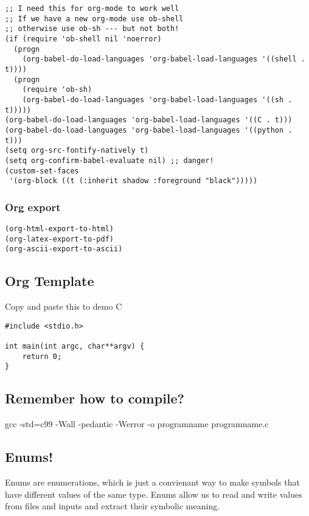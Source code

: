 \documentclass[11pt]{article}
\begin{document}
\begin{verbatim}
;; I need this for org-mode to work well
;; If we have a new org-mode use ob-shell
;; otherwise use ob-sh --- but not both!
(if (require 'ob-shell nil 'noerror)
  (progn
    (org-babel-do-load-languages 'org-babel-load-languages '((shell . t))))
  (progn
    (require 'ob-sh)
    (org-babel-do-load-languages 'org-babel-load-languages '((sh . t)))))
(org-babel-do-load-languages 'org-babel-load-languages '((C . t)))
(org-babel-do-load-languages 'org-babel-load-languages '((python . t)))
(setq org-src-fontify-natively t)
(setq org-confirm-babel-evaluate nil) ;; danger!
(custom-set-faces
 '(org-block ((t (:inherit shadow :foreground "black")))))
\end{verbatim}

\subsubsection{Org export}
\label{sec:org2a87fcf}
\begin{verbatim}
(org-html-export-to-html)
(org-latex-export-to-pdf)
(org-ascii-export-to-ascii)
\end{verbatim}

\subsection{Org Template}
\label{sec:org5a42856}
Copy and paste this to demo C

\begin{verbatim}
#include <stdio.h>

int main(int argc, char**argv) {
    return 0;
}
\end{verbatim}

\subsection{Remember how to compile?}
\label{sec:org9943a28}

gcc -std=c99 -Wall -pedantic -Werror -o programname programname.c


\subsection{Enums!}
\label{sec:org3550201}

Enums are enumerations, which is just a convienant way to make symbols
that have different values of the same type. Enums allow us to read
and write values from files and inputs and extract their symbolic meaning.
\end{document}
